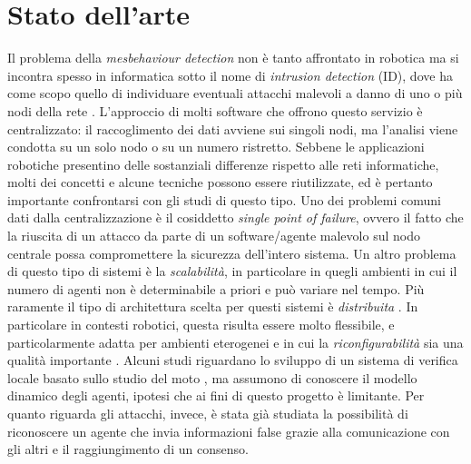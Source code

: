 \documentclass[paper=a4, fontsize=11pt]{scrartcl} %
\numberwithin{equation}{section} %
\numberwithin{table}{section} %
\begin{document}
\section{Stato dell'arte}
Il problema della \textit{mesbehaviour detection} non è tanto affrontato
in robotica ma si incontra spesso in informatica sotto il nome di \textit{intrusion detection} (ID), dove ha come scopo quello di individuare eventuali attacchi malevoli 
a danno di uno o più nodi della rete \cite{IDS3}\cite{Pasqualetti_attackdetection}. L'approccio di molti software che offrono questo servizio è centralizzato: il raccoglimento dei dati avviene sui singoli nodi, ma l'analisi viene condotta su un solo nodo o su un numero ristretto. Sebbene le applicazioni robotiche presentino delle sostanziali differenze rispetto alle reti informatiche, molti dei concetti e alcune tecniche possono essere riutilizzate, ed è pertanto importante confrontarsi con gli studi di questo tipo. Uno dei problemi comuni dati dalla centralizzazione è il cosiddetto \textit{single point of failure}, ovvero il
fatto che la riuscita di un attacco da parte di un software/agente malevolo sul nodo centrale possa compromettere la sicurezza dell'intero sistema. 
Un altro problema di questo tipo di sistemi è la \textit{scalabilità}, in particolare in quegli ambienti in cui il numero di 
agenti non è determinabile a priori e può variare nel tempo. 
Più raramente il tipo di architettura scelta per questi sistemi è \textit{distribuita} \cite{IDS2}. In particolare in contesti robotici, questa risulta essere molto flessibile, e particolarmente adatta per ambienti eterogenei e in cui la \textit{riconfigurabilità} sia 
una qualità importante \cite{ram10-bfp}. Alcuni studi riguardano 
lo sviluppo di un sistema di verifica locale basato sullo studio del moto \cite{misbehDetection}, ma assumono di conoscere il modello dinamico degli
agenti, ipotesi che ai fini di questo progetto è limitante. Per quanto
riguarda gli attacchi, invece, è stata già studiata la possibilità di 
riconoscere un agente che invia informazioni false grazie alla comunicazione con gli altri e il raggiungimento di un consenso\cite{commDetection}. 

\end{document}
